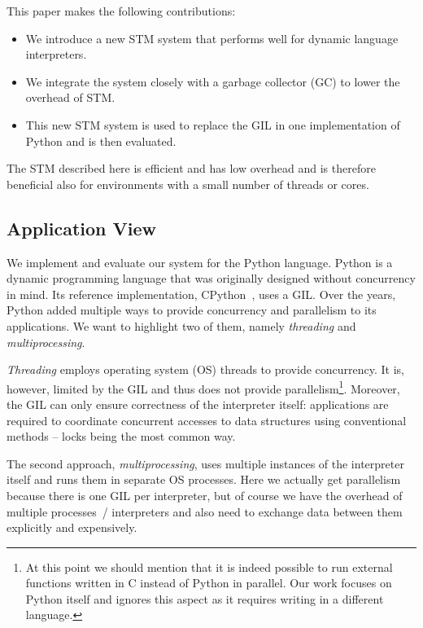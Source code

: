 \documentclass{sigplanconf}
\begin{document}
This paper makes the following contributions:
\begin{itemize}
\item We introduce a new STM system that performs well for dynamic
  language interpreters.
\vspace{3mm}               %
\item We integrate the system closely with a garbage collector
  (GC) to lower the overhead of STM.
\item This new STM system is used to replace the GIL in one
  implementation of Python and is then evaluated.
\end{itemize}

The STM described here is efficient and has low overhead and is
therefore beneficial also for environments with a small number of
threads or cores.

\subsection{Application View}

We implement and evaluate our system for the Python language. Python
is a dynamic programming language that was originally designed without
concurrency in mind.
Its reference implementation, CPython~\cite{cpython}, uses a
GIL. Over the years, Python added multiple ways to provide concurrency and
parallelism to its applications. We want to highlight two of them,
namely \emph{threading} and \emph{multiprocessing}.

\emph{Threading} employs operating system (OS) threads to provide
concurrency. It is, however, limited by the GIL and thus does not
provide parallelism\footnote{At this point we should mention that it is indeed
possible to run external functions written in C instead of Python in
parallel. Our work focuses on Python itself and ignores this aspect as
it requires writing in a different language.}.  Moreover, the GIL can
only ensure correctness of the interpreter itself: applications are
required to coordinate concurrent accesses to data structures using
conventional methods -- locks being the most common way.

The second approach, \emph{multiprocessing}, uses multiple instances
of the interpreter itself and runs them in separate OS processes.
Here we actually get parallelism because there is one GIL per
interpreter, but of course we have the overhead of multiple processes~/
interpreters and also need to exchange data between them explicitly
and expensively.
\end{document}
